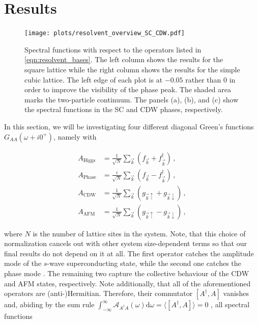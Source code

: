 \documentclass[
    reprint, 
    aps,
    preprintnumbers,
    twocolumn,
    prb,
    superscriptaddress
]{revtex4-2}
\newcommand{\vk}{\vec{k}}
\newcommand{\up}{\uparrow}
\newcommand{\down}{\downarrow}
\begin{document}
\section{Results}\label{sec:results}

\begin{figure}
    \centering
    \texttt{[image: plots/resolvent\_overview\_SC\_CDW.pdf]}
    \caption{Spectral functions with respect to the operators listed in \eqref{eqn:resolvent_bases}.
    The left column shows the results for the square lattice while the right column shows the results for the simple cubic lattice.
    The left edge of each plot is at $-0.05$ rather than $0$ in order to improve the visibility of the phase peak.
    The shaded area marks the two-particle continuum.
    The panels (a), (b), and (c) show the spectral functions in the SC and CDW phases, respectively.}
    \label{fig:resolvent_overview_SC}
\end{figure}

In this section, we will be investigating four different diagonal Green's functions $G_{AA}(\omega + i0^+)$, namely with

\begin{subequations}
    \label{eqn:resolvent_bases}
    \begin{align}
        A_\text{Higgs} &= \frac{1}{\sqrt{N}} \sum_{\vk} \left( f_{\vk} + f_{\vk}^\dagger \right)\,,\\
        A_\text{Phase} &= \frac{i}{\sqrt{N}} \sum_{\vk} \left( f_{\vk} - f_{\vk}^\dagger \right)\,,\\
        A_\text{CDW} &= \frac{1}{\sqrt{N}} \sum_{\vk} \left( g_{\vk \up} + g_{\vk \down} \right)\,,\\
        A_\text{AFM} &= \frac{1}{\sqrt{N}} \sum_{\vk} \left( g_{\vk \up} - g_{\vk \down} \right)\,,
    \end{align}
\end{subequations}

where $N$ is the number of lattice sites in the system. 
Note, that this choice of normalization cancels out with other system size-dependent terms so that our final results do not depend on it at all.
The first operator catches the amplitude mode of the $s$-wave superconducting state, while the second one catches the phase mode \cite{Fan22}.
The remaining two capture the collective behaviour of the CDW and AFM states, respectively.
\newline
Note additionally, that all of the aforementioned operators are (anti-)Hermitian. 
Therefore, their commutator $[A^\dagger, A]$ vanishes and, 
abiding by the sum rule $\int_{-\infty}^\infty \mathcal{A}_{A^\dagger A} (\omega) \mathrm{d}\omega = \langle [A^\dagger, A] \rangle = 0$ \cite{rickayzen80},
all spectral functions
\end{document}
